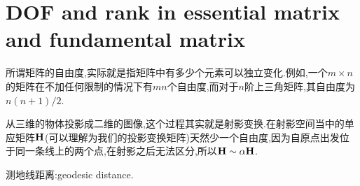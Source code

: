 \chapter{DOF and rank in essential matrix and fundamental matrix}
	\label{DOFandRank}
	所谓矩阵的自由度,实际就是指矩阵中有多少个元素可以独立变化.例如,一个$m \times n$的矩阵在不加任何限制的情况下有$mn$个自由度,而对于$n$阶上三角矩阵,其自由度为$n(n+1)/2$.
	
	从三维的物体投影成二维的图像,这个过程其实就是射影变换.在射影空间当中的单应矩阵$\bold{H}$(可以理解为我们的投影变换矩阵)天然少一个自由度,因为自原点出发位于同一条线上的两个点,在射影之后无法区分,所以$\bold{H} \sim \alpha \bold{H}$.
	
	测地线距离:geodesic distance.
	